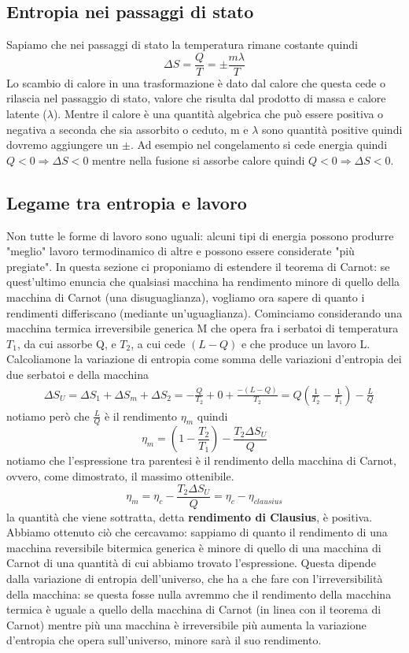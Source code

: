 \documentclass[10pt,a4paper]{article}
\begin{document}
\subsection{Entropia nei passaggi di stato}
Sapiamo che nei passaggi di stato la temperatura rimane costante quindi
\[\Delta S = \frac{Q}{T}=\pm\frac{m\lambda}{T}\]
Lo scambio di calore in una trasformazione è dato dal calore che questa cede o rilascia nel passaggio di stato, valore che risulta dal prodotto di massa e calore latente ($\lambda$). Mentre il calore è una quantità algebrica che può essere positiva o negativa a seconda che sia assorbito o ceduto, m e $\lambda$ sono quantità positive quindi dovremo aggiungere un $\pm$. Ad esempio nel congelamento si cede energia quindi \(Q<0\Rightarrow \Delta S < 0\) mentre nella fusione si assorbe calore quindi \(Q<0\Rightarrow \Delta S < 0\). 
\subsection{Legame tra entropia e lavoro}
 Non tutte le forme di lavoro sono uguali: alcuni tipi di energia possono produrre "meglio" lavoro termodinamico di altre e possono essere considerate "più pregiate". In questa sezione ci proponiamo di estendere il teorema di Carnot: se quest'ultimo enuncia che qualsiasi macchina ha rendimento minore di quello della macchina di Carnot (una disuguaglianza), vogliamo ora sapere di quanto i rendimenti differiscano (mediante un'uguaglianza). Cominciamo considerando una macchina termica irreversibile generica M che opera fra i serbatoi di temperatura \(T_1\), da cui assorbe Q, e \(T_2\), a cui cede \((L-Q)\) e che produce un lavoro L. Calcoliamone la variazione di entropia come somma delle variazioni d'entropia dei due serbatoi e della macchina
 \begin{align*}
 	&\Delta S_U = \Delta S_1 + \Delta S_m + \Delta S_2 = -\frac{Q}{T_2}+0+\frac{-(L-Q)}{T_2}= Q \left(\frac{1}{T_2}-\frac{1}{T_1}\right)-\frac{L}{Q}
 \end{align*}
notiamo però che $\frac{L}{Q}$ è il rendimento \(\eta_m\) quindi 
\[ \eta_m = \left(1-\frac{T_2}{T_1}\right)-\frac{T_2\Delta S_U}{Q} \]
notiamo che l'espressione tra parentesi è il rendimento della macchina di Carnot, ovvero, come dimostrato, il massimo ottenibile. 
\[ \eta_m = \eta_c-\frac{T_2\Delta S_U}{Q} = \eta_c - \eta_{clausius} \]
la quantità che viene sottratta, detta \textbf{rendimento di Clausius}, è positiva. Abbiamo ottenuto ciò che cercavamo: sappiamo di quanto il rendimento di una macchina reversibile bitermica generica è minore di quello di una macchina di Carnot di una quantità di cui abbiamo trovato l'espressione. Questa dipende dalla variazione di entropia dell'universo, che ha a che fare con l'irreversibilità della macchina: se questa fosse nulla avremmo che il rendimento della macchina termica è uguale a quello della macchina di Carnot (in linea con il teorema di Carnot) mentre più una macchina è irreversibile più aumenta la variazione d'entropia che opera sull'universo, minore sarà il suo rendimento.\\
\end{document}
